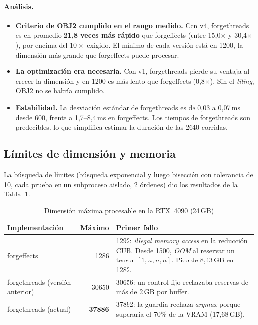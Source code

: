 \documentclass[11pt,a4paper]{article}
\begin{document}
\paragraph{Análisis.}
\begin{itemize}
  \item \textbf{Criterio de OBJ2 cumplido en el rango medido.} Con v4, forgethreads es en
        promedio \textbf{21,8 veces más rápido} que forgeffects (entre 15,0$\times$ y
        30,4$\times$), por encima del $10\times$ exigido. El mínimo de cada versión está en
        \num{1200}, la dimensión más grande que forgeffects puede procesar.
  \item \textbf{La optimización era necesaria.} Con v1, forgethreads pierde su ventaja al
        crecer la dimensión y en \num{1200} es más lento que forgeffects (0,8$\times$). Sin el
        \emph{tiling}, OBJ2 no se habría cumplido.
  \item \textbf{Estabilidad.} La desviación estándar de forgethreads es de 0,03 a 0,07\,ms
        desde 600, frente a 1,7--8,4\,ms en forgeffects. Los tiempos de forgethreads son
        predecibles, lo que simplifica estimar la duración de las \num{2640} corridas.
\end{itemize}

\subsection{Límites de dimensión y memoria}
La búsqueda de límites (búsqueda exponencial y luego bisección con tolerancia de 10, cada
prueba en un subproceso aislado, 2 órdenes) dio los
resultados de la Tabla~\ref{tab:limites}.

\begin{table}[h]
\centering
\caption{Dimensión máxima procesable en la RTX~4090 (24\,GB)}\label{tab:limites}
\begin{tabular}{p{3.9cm}rp{8.2cm}}
\toprule
\textbf{Implementación} & \textbf{Máximo} & \textbf{Primer fallo}\\
\midrule
forgeffects & \num{1286} & \num{1292}: \emph{illegal memory access} en la reducción CUB.
Desde \num{1500}, \emph{OOM} al reservar un tensor $[1,n,n,n]$. Pico de 8,43\,GB en \num{1282}.\\
\addlinespace
forgethreads (versión anterior) & \num{30650} & \num{30656}: un control fijo rechazaba
reservas de más de 2\,GB por buffer.\\
\addlinespace
forgethreads (actual) & \textbf{\num{37886}} & \num{37892}: la guardia rechaza
\emph{argmax} porque superaría el 70\% de la VRAM (17,68\,GB).\\
\bottomrule
\end{tabular}
\end{table}
\end{document}
